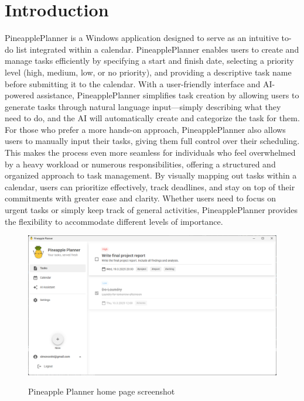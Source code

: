 \documentclass{article}
\begin{document}
\newpage

\tableofcontents
\thispagestyle{empty}

\newpage
\listoffigures
\lstlistoflistings
\listoftables

\newpage

\section{Introduction}

PineapplePlanner is a Windows application designed to serve as an intuitive to-do list integrated within a calendar.
PineapplePlanner enables users to create and manage tasks efficiently by specifying a start and finish date, selecting a priority level (high, medium, low, or no priority), and providing a descriptive task name before submitting it to the calendar.
With a user-friendly interface and AI-powered assistance, PineapplePlanner simplifies task creation by allowing users to generate tasks through natural language input—simply describing what they need to do, and the AI will automatically create and categorize the task for them.
For those who prefer a more hands-on approach, PineapplePlanner also allows users to manually input their tasks, giving them full control over their scheduling.
This makes the process even more seamless for individuals who feel overwhelmed by a heavy workload or numerous responsibilities, offering a structured and organized approach to task management.
By visually mapping out tasks within a calendar, users can prioritize effectively, track deadlines, and stay on top of their commitments with greater ease and clarity.
Whether users need to focus on urgent tasks or simply keep track of general activities, PineapplePlanner provides the flexibility to accommodate different levels of importance.

\begin{figure}[ht!]
  \centering
  \includegraphics[width=1\textwidth]{images/pineapple_planner_screenshot_home.png}
  \label{Infrastructure proposal}
  \caption{Pineapple Planner home page screenshot}
\end{figure}
\end{document}
